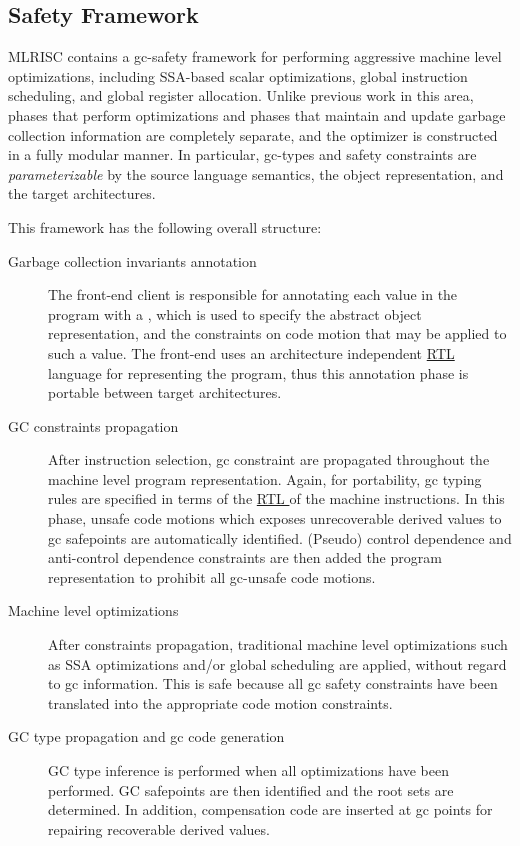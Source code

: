 \subsection{Safety Framework}
  MLRISC contains a gc-safety framework 
for performing aggressive machine level optimizations, including SSA-based
scalar optimizations, global instruction scheduling, and global
register allocation.  Unlike previous work in this area, phases that
perform optimizations and phases that maintain and update 
garbage collection information are completely separate, and the optimizer
is constructed in a fully modular manner.  In particular,
gc-types and safety constraints 
are \emph{parameterizable} 
by the source language semantics, the object representation, 
and the target architectures.  

This framework has the following overall structure:
\begin{description}
\item[Garbage collection invariants annotation]
The front-end client is responsible for annotating each 
value in the program with a , which is 
used to specify the abstract object representation, 
and the constraints on code motion that may be applied to such a value.
The front-end uses an architecture independent \href{mltree.html}{RTL} 
language for representing the program, thus this annotation 
phase is portable between target architectures. 
\item[GC constraints propagation]
    After instruction selection, gc constraint are propagated throughout
the machine level program representation.  Again, for portability, gc typing
rules are specified in terms of the \href{mltree.html}{ RTL } of
the machine instructions.  In this phase, unsafe code motions which
exposes unrecoverable derived values to gc safepoints are automatically 
identified.   (Pseudo) control dependence and anti-control dependence 
constraints are then added the  program representation to prohibit all
gc-unsafe code motions.
\item[Machine level optimizations]
    After constraints propagation, traditional 
machine level optimizations such as
SSA optimizations and/or global scheduling are applied, without regard
to gc information.  This is safe because 
all gc safety constraints have been translated into the appropriate 
code motion constraints. 
\item[GC type propagation and gc code generation]
    GC type inference is performed when all optimizations
have been performed.  GC safepoints are then
identified and the root sets are determined.  In addition, compensation
code are inserted at gc points for repairing recoverable derived values.
\end{description}
